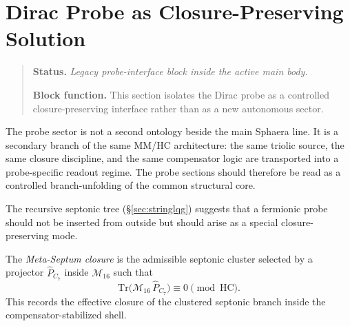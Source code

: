 
\section{Dirac Probe as Closure-Preserving Solution}
\begin{quote}\small
\noindent\textbf{Status.} \emph{Legacy probe-interface block inside the active main body.}\par
\noindent\textbf{Block function.} This section isolates the Dirac probe as a controlled closure-preserving interface rather than as a new autonomous sector.
\end{quote}
\label{sec:dirac-probe}

\begin{remark}
The probe sector is not a second ontology beside the main Sphaera line.
It is a secondary branch of the same MM/HC architecture: the same
triolic source, the same closure discipline, and the same compensator
logic are transported into a probe-specific readout regime. The probe
sections should therefore be read as a controlled branch-unfolding of
the common structural core.
\end{remark}

\begin{remark}
The recursive septonic tree (§\ref{sec:stringlqg}) suggests that
a fermionic probe should not be inserted from outside but should arise
as a special closure-preserving mode.
\end{remark}

\begin{definition}
The \emph{Meta-Septum closure} is the admissible septonic cluster
selected by a projector $\hat P_{C_7}$ inside $\mathcal{M}_{16}$ such
that
\[
 \mathrm{Tr}\!\bigl(\mathcal{M}_{16}\,\hat P_{C_7}\bigr)
 \equiv 0\pmod{\mathrm{HC}}.
\]
This records the effective closure of the clustered septonic branch
inside the compensator-stabilized shell.
\end{definition}

